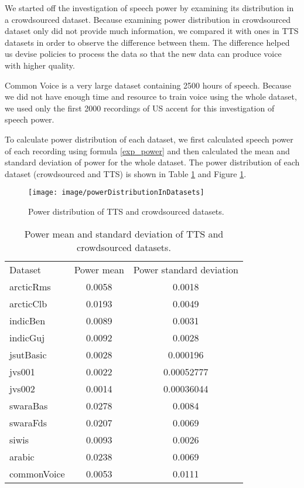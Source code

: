 \documentclass[12pt]{article}
\begin{document}
We started off the investigation of speech power by examining its distribution in a crowdsourced dataset. Because examining power distribution in crowdsourced dataset only did not provide much information, we compared it with ones in TTS datasets in order to observe the difference between them. The difference helped us devise policies to process the data so that the new data can produce voice with higher quality.

Common Voice is a very large dataset containing 2500 hours of speech. Because we did not have enough time and resource to train voice using the whole dataset, we used only the first 2000 recordings of US accent for this investigation of speech power.

To calculate power distribution of each dataset, we first calculated speech power of each recording using formula \ref{exp_power} and then calculated the mean and standard deviation of power for the whole dataset. The power distribution of each dataset (crowdsourced and TTS) is shown in Table \ref{tab_powerDistribution} and Figure \ref{fig_powerDistribution}.

\begin{figure}[t]
\begin{center}
\texttt{[image: image/powerDistributionInDatasets]}
\end{center}
\vspace{-0.3cm}
\caption[Power distribution in TTS and crowdsourced datasets.]{Power distribution of TTS and crowdsourced datasets.}
\label{fig_powerDistribution}
\end{figure}

\begin{table}[]
\begin{center}
\caption{Power mean and standard deviation of TTS and crowdsourced datasets.}
\label{tab_powerDistribution}
\vspace{3mm}
\begin{tabular}{lcc}
\hline
Dataset & Power mean & Power standard deviation \\
\cmidrule(l{0pt}r{2pt}){1-1}\cmidrule(l{0pt}r{2pt}){2-2}\cmidrule(l{0pt}r{2pt}){3-3}
arcticRms   & 0.0058 & 0.0018 \\
arcticClb   & 0.0193 & 0.0049 \\
indicBen    & 0.0089 & 0.0031 \\
indicGuj    & 0.0092 & 0.0028 \\
jsutBasic   & 0.0028 & 0.000196 \\
jvs001      & 0.0022 & 0.00052777 \\
jvs002      & 0.0014 & 0.00036044 \\
swaraBas    & 0.0278 & 0.0084 \\
swaraFds    & 0.0207 & 0.0069 \\
siwis       & 0.0093 & 0.0026 \\
arabic      & 0.0238 & 0.0069 \\
commonVoice & 0.0053 & 0.0111 \\
\hline
\end{tabular}
\end{center}
\end{table}
\end{document}
